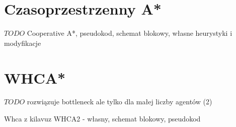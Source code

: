 \section{Czasoprzestrzenny A*}
$TODO$ Cooperative A*, pseudokod, schemat blokowy, własne heurystyki i modyfikacje

\section{WHCA*}
$TODO$ rozwiązuje bottleneck ale tylko dla małej liczby agentów (2)

Whca z kilavuz
WHCA2 - własny, schemat blokowy, pseudokod